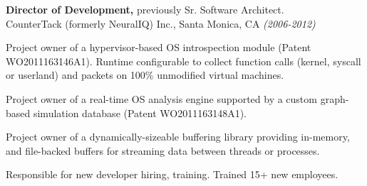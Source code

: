 \documentclass[margin]{res}
\begin{document}
\begin{resume}
{\bf Director of Development,} previously Sr. Software Architect. \\
CounterTack (formerly NeuralIQ) Inc., Santa Monica, CA {\em (2006-2012)}
\begin{list}{}{\leftmargin=1.5em \topsep=5pt \partopsep=0pt \parsep=2.5pt}
  \item Project owner of a hypervisor-based OS introspection module
    (Patent WO2011163146A1). Runtime configurable to collect function
    calls (kernel, syscall or userland) and packets on 100\%
    unmodified virtual machines.
  \item Project owner of a real-time OS analysis engine supported by a
    custom graph-based simulation database (Patent WO2011163148A1).
  \item Project owner of a dynamically-sizeable buffering library
    providing in-memory, and file-backed buffers for streaming
    data between threads or processes.
  \item Responsible for new developer hiring, training.  Trained 15+
    new employees.
\end{list}




\end{resume}
\end{document}
